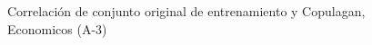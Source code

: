 \begin{figure}[H]
    \centering
    
    \caption{Correlación de conjunto original de entrenamiento y Copulagan, Economicos (A-3)}
    \label{pairwise-economicos-a-3-copulagan}
\end{figure}